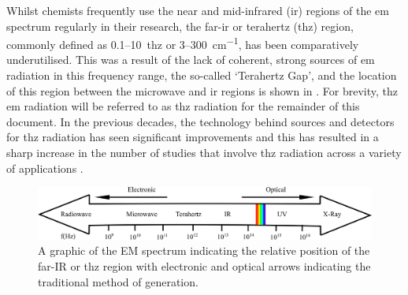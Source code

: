 Whilst chemists frequently use the near and mid\nobreakdash-infrared (\acrshort{ir}) regions of the \acrfull{em} spectrum regularly in their research, the far\nobreakdash-\acrshort{ir} or terahertz (\acrshort{thz}) region, commonly defined as 0.1\nobreakdash--\SI{10}{\acrshort{thz}} or 3\nobreakdash--\SI{300}{cm^{-1}}, has been comparatively underutilised. This was a result of the lack of coherent, strong sources of \acrshort{em} radiation in this frequency range, the so\nobreakdash-called `Terahertz Gap', and the location of this region between the microwave and \acrshort{ir} regions is shown in . For brevity, \acrshort{thz} \acrshort{em} radiation will be referred to as \acrshort{thz} radiation for the remainder of this document. In the previous decades, the technology behind sources and detectors for \acrshort{thz} radiation has seen significant improvements and this has resulted in a sharp increase in the number of studies that involve \acrshort{thz} radiation across a variety of applications \cite{Lewis2014}. 

\begin{figure}
    \centering
    \includegraphics[scale = 0.6]{Figures/Misc/Theory/EMSpectrum.png}
    \captionsetup{font = footnotesize, justification = centering}
    \caption[A Graphic of the Electromagnetic Spectrum]{A graphic of the EM spectrum indicating the relative position of the far-IR or \acrshort{thz} region with electronic and optical arrows indicating the traditional method of generation.}
    \label{fig:emspectrum}
\end{figure}

